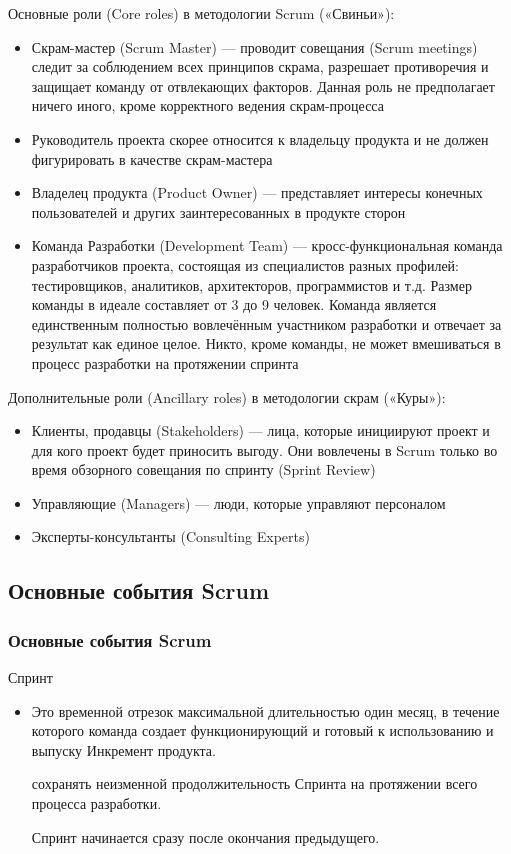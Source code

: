 \documentclass{../industrial-development}
\begin{document}
Основные роли (Core roles) в методологии Scrum («Свиньи»):
\begin{itemize}
	\item \alert{Скрам-мастер} (Scrum Master) — проводит совещания (Scrum meetings) следит за соблюдением всех принципов скрама, разрешает противоречия и защищает команду от отвлекающих факторов. Данная роль не предполагает ничего иного, кроме корректного ведения скрам-процесса
	\item Руководитель проекта скорее относится к \alert{владельцу продукта} и не должен фигурировать в качестве скрам-мастера
  \item \alert{Владелец продукта (Product Owner)} — представляет интересы конечных пользователей и других заинтересованных в продукте сторон
  \item \alert{Команда Разработки (Development Team)} — кросс-функциональная команда разработчиков проекта, состоящая из специалистов разных профилей: тестировщиков, аналитиков, архитекторов, программистов и т.д. Размер команды в идеале составляет от 3 до 9 человек. Команда является единственным полностью вовлечённым участником разработки и отвечает за результат как единое целое. Никто, кроме команды, не может вмешиваться в процесс разработки на протяжении спринта
\end{itemize}
Дополнительные роли (Ancillary roles) в методологии скрам («Куры»):
\begin{itemize}
	\item Клиенты, продавцы (Stakeholders) — лица, которые инициируют проект и для кого проект будет приносить выгоду. Они вовлечены в Scrum только во время обзорного совещания по спринту (Sprint Review)
	\item Управляющие (Managers) — люди, которые управляют персоналом
	\item Эксперты-консультанты (Consulting Experts)~\cite{Scrum}
\end{itemize}

\subsection{Основные события Scrum}
\begin{frame} \frametitle {Основные события Scrum}
\begin {block} {Спринт}
\begin {itemize}
 служит \alert{ядром} Скрама. 

\item Это временной отрезок максимальной длительностью \alert{один месяц}, в течение которого команда создает функционирующий и  готовый к использованию и выпуску Инкремент продукта. 

 сохранять \alert{неизменной} продолжительность Спринта на протяжении всего процесса разработки. 

 Спринт начинается сразу после окончания предыдущего.
\end {itemize} 
\end {block}\end{frame}
\end{document}
